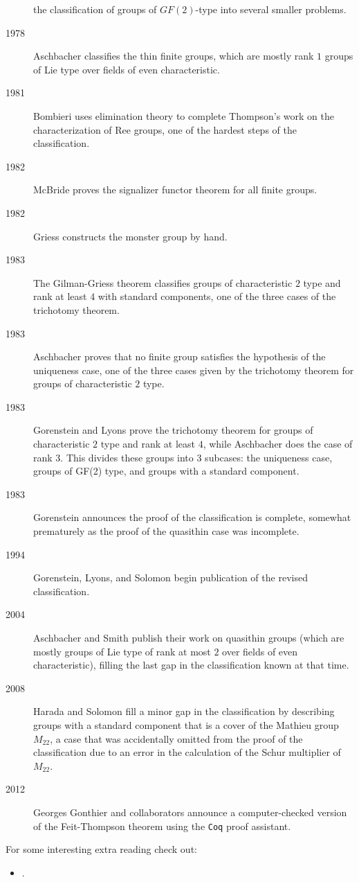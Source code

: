 \documentclass{ximera}
\begin{document}
\begin{description}
  the classification of groups of $GF(2)$-type into several smaller
  problems.
\item[1978] Aschbacher classifies the thin finite groups, which are
  mostly rank $1$ groups of Lie type over fields of even
  characteristic.
\item[1981] Bombieri uses elimination theory to complete Thompson's
  work on the characterization of Ree groups, one of the hardest steps
  of the classification.
\item[1982] McBride proves the signalizer functor theorem for all
  finite groups.
\item[1982] Griess constructs the monster group by hand.
\item[1983] The Gilman-Griess theorem classifies groups of
  characteristic $2$ type and rank at least $4$ with standard
  components, one of the three cases of the trichotomy theorem.
\item[1983] Aschbacher proves that no finite group satisfies the
  hypothesis of the uniqueness case, one of the three cases given by
  the trichotomy theorem for groups of characteristic $2$ type.
\item[1983] Gorenstein and Lyons prove the trichotomy theorem for
  groups of characteristic $2$ type and rank at least $4$, while
  Aschbacher does the case of rank $3$. This divides these groups into
  3 subcases: the uniqueness case, groups of GF(2) type, and groups
  with a standard component.
\item[1983] Gorenstein announces the proof of the classification is
  complete, somewhat prematurely as the proof of the quasithin case
  was incomplete.
\item[1994] Gorenstein, Lyons, and Solomon begin publication of the
  revised classification.
\item[2004] Aschbacher and Smith publish their work on quasithin
  groups (which are mostly groups of Lie type of rank at most $2$ over
  fields of even characteristic), filling the last gap in the
  classification known at that time.
\item[2008] Harada and Solomon fill a minor gap in the classification
  by describing groups with a standard component that is a cover of
  the Mathieu group $M_{22}$, a case that was accidentally omitted
  from the proof of the classification due to an error in the
  calculation of the Schur multiplier of $M_{22}$.
\item[2012] Georges Gonthier and collaborators announce a
  computer-checked version of the Feit-Thompson theorem using the \texttt{Coq}
  proof assistant.
\end{description}

For some interesting extra reading check out:
\begin{itemize}
\item {}.


\end{itemize}
\end{document}
